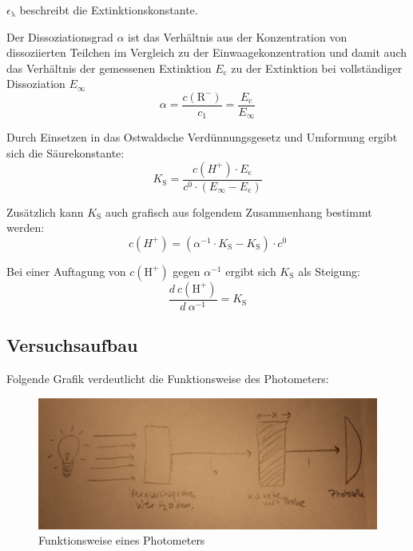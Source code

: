 \documentclass[12pt,a4paper,titlepage,headinclude,bibtotoc]{scrartcl}
\begin{document}
$\epsilon_\mathrm{\lambda}$ beschreibt die Extinktionskonstante. 

Der Dissoziationsgrad $\alpha$ ist das Verhältnis aus der Konzentration von dissoziierten Teilchen im Vergleich zu der Einwaagekonzentration und damit auch das Verhältnis der gemessenen Extinktion $E_\mathrm{c}$ zu der Extinktion bei vollständiger Dissoziation $E_\infty$\\

\begin{equation}
\alpha = \frac{c(\mathrm{R^-})}{c_1} = \frac{E_\mathrm{c}}{E_\infty}
\end{equation}

Durch Einsetzen in das Ostwaldsche Verdünnungsgesetz und Umformung  ergibt sich die Säurekonstante:\\

\begin{equation}
K_\mathrm{S} =\frac{c(H^+) \cdot E_\mathrm{c}}{c^0 \cdot (E_\infty - E_\mathrm{c})}
\end{equation}

Zusätzlich kann $K_\mathrm{S}$ auch grafisch aus folgendem Zusammenhang bestimmt werden:\\

\begin{equation}
c(H^+) = (\alpha^{-1} \cdot K_\mathrm{S} - K_\mathrm{S}) \cdot c^0
\end{equation}

Bei einer Auftagung von $c(\mathrm{H^+})$ gegen $\alpha^{-1}$ ergibt sich $K_\mathrm{S}$ als Steigung:\\

\begin{equation}
\frac{d{~}c(\mathrm{H^+})}{d{~}\alpha^{-1}} = K_\mathrm{S}
\end{equation}

\subsection{Versuchsaufbau}

Folgende Grafik verdeutlicht die Funktionsweise des Photometers:

\begin{figure} [h!]
\begin{center}
\includegraphics[scale=0.6]{Photometer.png} \end{center}
\caption {Funktionsweise eines Photometers}
\end{figure}
\end{document}
